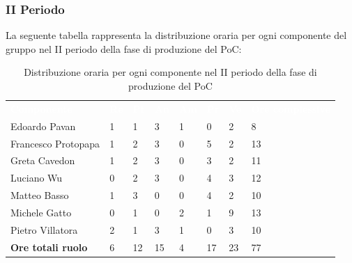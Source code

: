 \subsubsection{II Periodo}
La seguente tabella rappresenta la distribuzione oraria per ogni componente del gruppo nel II periodo della fase di produzione del PoC:
\begin{table}[!htbp]
\begin{center}
\renewcommand{\arraystretch}{1.25}
\begin{tabular}{ m{}<{\centering}  m{}<{\centering} m{}<{\centering} m{}<{\centering}  m{}<{\centering}  m{}<{\centering}  m{}<{\centering}  m{}<{\centering}   }
	\rowcolor{darkblue}
	\textcolor{white}{\textbf{Componente}} &\textcolor{white}{\textbf{Re}}&\textcolor{white}{\textbf{Pt}}&\textcolor{white}{\textbf{An}}&\textcolor{white}{\textbf{Am}}&\textcolor{white}{\textbf{Pr}}&\textcolor{white}{\textbf{Ve}}&\textcolor{white}{\textbf{Ore complessive}}\\ 
	Edoardo Pavan & 1 & 1 & 3 & 1 & 0 & 2 & 8 \\	
	
	Francesco Protopapa & 1 & 2 & 3 & 0 & 5 & 2 & 13 \\

	Greta Cavedon & 1 & 2 & 3 & 0 & 3 & 2 & 11 \\
	
	Luciano Wu & 0 & 2 & 3 & 0 & 4 & 3 & 12\\
	
	Matteo Basso & 1 & 3 & 0 & 0 & 4 & 2 & 10 \\
	
	Michele Gatto &  0 & 1 & 0 & 2 & 1 & 9 & 13\\
	
	Pietro Villatora & 2 & 1 & 3 & 1 & 0 & 3 & 10 \\
	
	\textbf{Ore totali ruolo} & 6 & 12 & 15 & 4 & 17 & 23 & 77\\

\end{tabular}
\caption{Distribuzione oraria per ogni componente nel II periodo della fase di produzione del PoC}
\end{center}
\end{table}

